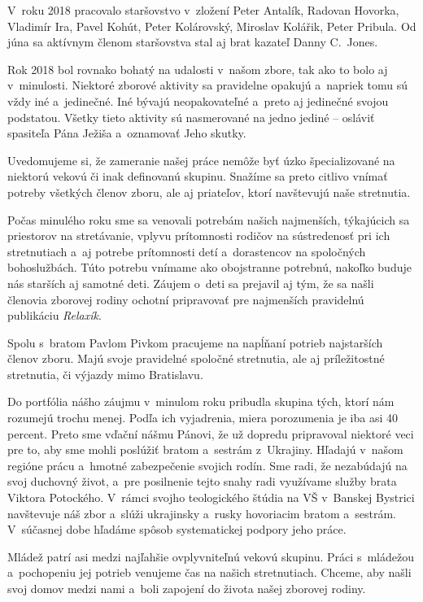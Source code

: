 V~roku 2018 pracovalo staršovstvo v~zložení Peter Antalík, Radovan Hovorka, Vladimír Ira, Pavel Kohút, Peter Kolárovský, Miroslav Kolářik, Peter Pribula. Od júna sa aktívnym členom staršovstva stal aj brat kazateľ Danny C.~Jones.

Rok 2018 bol rovnako bohatý na udalosti v~našom zbore, tak ako to bolo aj v~minulosti. Niektoré zborové aktivity sa pravidelne opakujú a~napriek tomu sú vždy iné a~jedinečné. Iné bývajú neopakovateľné a~preto aj jedinečné svojou podstatou. Všetky tieto aktivity sú nasmerované na jedno jediné -- osláviť spasiteľa Pána Ježiša a~oznamovať Jeho skutky.

Uvedomujeme si, že zameranie našej práce nemôže byť úzko špecializované na niektorú vekovú či inak definovanú skupinu. Snažíme sa preto citlivo vnímať potreby všetkých členov zboru, ale aj priateľov, ktorí navštevujú naše stretnutia.

Počas minulého roku sme sa venovali potrebám našich najmenších, týkajúcich sa priestorov na stretávanie, vplyvu prítomnosti rodičov na sústredenosť pri ich stretnutiach a~aj potrebe prítomnosti detí a~dorastencov na spoločných bohoslužbách. Túto potrebu vnímame ako obojstranne potrebnú, nakoľko buduje nás starších aj samotné deti. Záujem o~deti sa prejavil aj tým, že sa našli členovia zborovej rodiny ochotní pripravovať pre najmenších pravidelnú publikáciu {\it Relaxík}.

Spolu s~bratom Pavlom Pivkom pracujeme na napĺňaní potrieb najstarších členov zboru. Majú svoje pravidelné spoločné stretnutia, ale aj príležitostné stretnutia, či výjazdy mimo Bratislavu.

Do portfólia nášho záujmu v~minulom roku pribudla skupina tých, ktorí nám rozumejú trochu menej. Podľa ich vyjadrenia, miera porozumenia je iba asi 40 percent. Preto sme vďační nášmu Pánovi, že už dopredu pripravoval niektoré veci pre to, aby sme mohli poslúžiť bratom a~sestrám z~Ukrajiny. Hľadajú v~našom regióne prácu a~hmotné zabezpečenie svojich rodín. Sme radi, že nezabúdajú na svoj duchovný život, a~pre posilnenie tejto snahy radi využívame služby brata Viktora Potockého. V~rámci svojho teologického štúdia na VŠ v~Banskej Bystrici navštevuje náš zbor a~slúži ukrajinsky a~rusky hovoriacim bratom a~sestrám. V~súčasnej dobe hľadáme spôsob systematickej podpory jeho práce.

Mládež patrí asi medzi najľahšie ovplyvniteľnú vekovú skupinu. Práci s~mládežou a~pochopeniu jej potrieb venujeme čas na našich stretnutiach. Chceme, aby našli svoj domov medzi nami a~boli zapojení do života našej zborovej rodiny.


